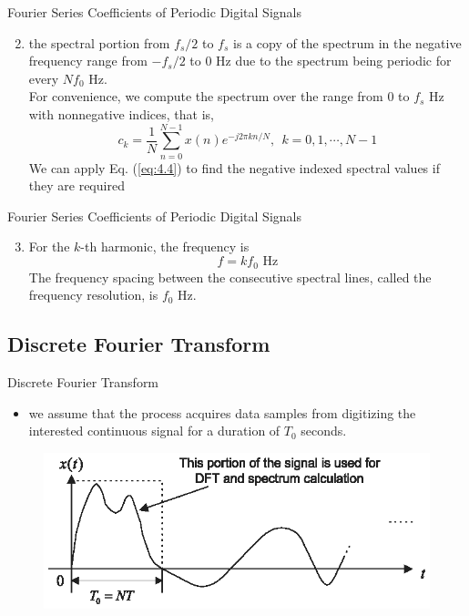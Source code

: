 \documentclass[pdflatex,compress,mathserif]{beamer}
\begin{document}
\begin{frame}{Fourier Series Coefficients of Periodic Digital Signals}
    \begin{enumerate}\setcounter{enumi}{1}
        \item the spectral portion from $f_s/2$ to $f_s$ is a copy of the spectrum in the negative frequency range from $-f_s/2$ to 0 Hz due to the spectrum being periodic for every $Nf_0$ Hz.\\ For convenience, we compute the spectrum over the range from 0 to $f_s$ Hz with nonnegative indices, that is,
        \begin{equation}
            c_k=\frac{1}{N} \sum_{n=0}^{N-1}x(n)e^{-j2\pi k n/N},~~k=0,1,\cdots,N-1
            \label{eq:4.5}
        \end{equation}
        We can apply Eq. (\ref{eq:4.4}) to find the negative indexed spectral values if they are required
    \end{enumerate}
\end{frame}

\begin{frame}{Fourier Series Coefficients of Periodic Digital Signals}
    \begin{enumerate}\setcounter{enumi}{2}
        \item For the $k$-th harmonic, the frequency is
        \begin{equation}
            f = kf_0 \text{ Hz}
        \end{equation}
        The frequency spacing between the consecutive spectral lines, called the frequency resolution, is $f_0$ Hz.
    \end{enumerate}
\end{frame}

\subsection{Discrete Fourier Transform}

\begin{frame}{Discrete Fourier Transform}
    \begin{itemize}
        \item we assume that the process acquires data samples from digitizing the interested continuous signal for a duration of $T_0$ seconds.
    \end{itemize}
    \begin{figure}
        \includegraphics[width=\linewidth]{fig/fig.4.06a}
    \end{figure}
\end{frame}
\end{document}

